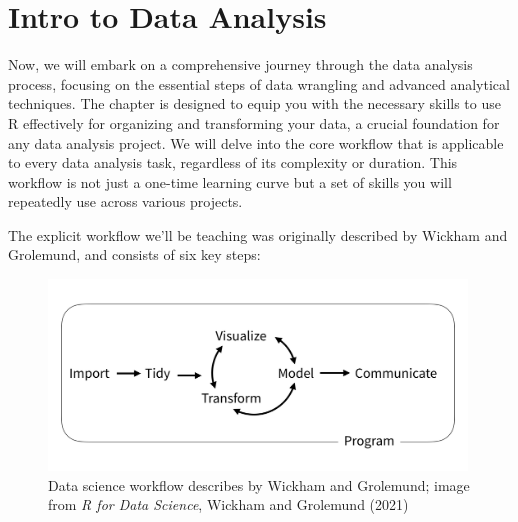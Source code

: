 \documentclass[
]{book}
\begin{document}
\hypertarget{intro-to-data-analysis}{%
\chapter{Intro to Data Analysis}\label{intro-to-data-analysis}}

Now, we will embark on a comprehensive journey through the data analysis process, focusing on the essential steps of data wrangling and advanced analytical techniques. The chapter is designed to equip you with the necessary skills to use R effectively for organizing and transforming your data, a crucial foundation for any data analysis project. We will delve into the core workflow that is applicable to every data analysis task, regardless of its complexity or duration. This workflow is not just a one-time learning curve but a set of skills you will repeatedly use across various projects.

The explicit workflow we'll be teaching was originally described by Wickham and Grolemund, and consists of six key steps:

\begin{figure}
\centering
\includegraphics[width=0.99\textwidth,height=\textheight]{images/data-science-workflow.png}
\caption{Data science workflow describes by Wickham and Grolemund; image from \emph{R for Data Science}, Wickham and Grolemund (2021)}
\end{figure}
\end{document}
